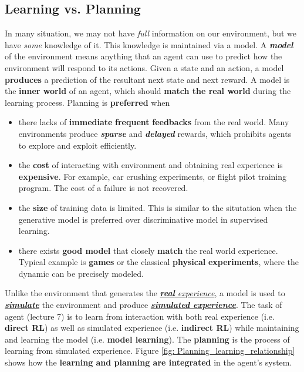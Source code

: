 \documentclass[11pt]{article}
\begin{document}
\subsection{Learning vs. Planning}
In many situation, we may not have \emph{full} information on our environment, but we have \emph{some} knowledge of it. This knowledge is maintained via a model. A \emph{\textbf{model}} of the environment means anything that an agent can use to predict how the environment will respond to its actions. Given a state and an action, a model \textbf{produces} a prediction of the resultant next state and next reward. A model is the \textbf{inner world} of an agent, which should \textbf{match the real world} during the learning process. Planning is \textbf{preferred} when
\begin{itemize}
\item there lacks of \textbf{immediate} \textbf{frequent} \textbf{feedbacks} from the real world. Many environments produce \emph{\textbf{sparse}} and \textbf{\emph{delayed}} rewards, which prohibits agents to explore and exploit efficiently.
\item the \textbf{cost} of interacting with environment and obtaining real experience is \textbf{expensive}. For example, car crushing experiments, or flight pilot training program. The cost of a failure is not recovered. 
\item the \textbf{size} of training data is limited. This is similar to the situtation when the generative model is preferred over discriminative model in supervised learning.
\item there exists \textbf{good model} that closely \textbf{match} the real world experience. Typical example is \textbf{games} or the classical \textbf{physical} \textbf{experiments}, where the dynamic can be precisely modeled. 
\end{itemize} Unlike the environment that generates the  \underline{\emph{\textbf{real} experience}}, a model is used to \underline{\emph{\textbf{simulate}}} the environment and produce \underline{\emph{\textbf{simulated experience}}}. The task of agent  (lecture 7) is to learn from interaction with both real experience (i.e. \textbf{direct RL}) as well as simulated experience (i.e. \textbf{indirect RL}) while maintaining and learning the model (i.e. \textbf{model learning}). The \textbf{planning} is the process of learning from simulated experience. Figure \ref{fig: Planning_learning_relationship} shows how the \textbf{learning and planning are integrated} in the agent's system. 
\end{document}

